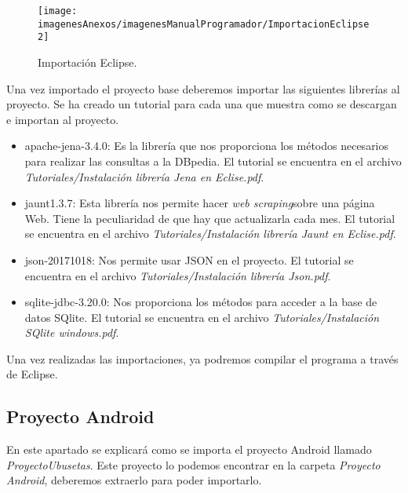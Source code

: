 \begin{figure}[h]
    \begin{center}%
        \begin{center}%
          \texttt{[image: imagenesAnexos/imagenesManualProgramador/ImportacionEclipse2]}%
          \caption{Importación Eclipse.}%
          \label{figImportacionEclipse2}%
        \end{center}%
  	\end{center}%
\end{figure}%

\clearpage
Una vez importado el proyecto base deberemos importar las siguientes librerías al proyecto. Se ha creado un tutorial para cada una que muestra como se descargan e importan al proyecto.

\begin{itemize}
	\item apache-jena-3.4.0: Es la librería que nos proporciona los métodos necesarios para realizar las consultas a la DBpedia. El tutorial se encuentra en el archivo \textit{Tutoriales/Instalación librería Jena en Eclise.pdf}.
	\item jaunt1.3.7: Esta librería nos permite hacer \textit{web scraping}sobre una página Web. Tiene la peculiaridad de que hay que actualizarla cada mes. El tutorial se encuentra en el archivo \textit{Tutoriales/Instalación librería Jaunt en Eclise.pdf}.
	\item json-20171018: Nos permite usar JSON en el proyecto. El tutorial se encuentra en el archivo \textit{Tutoriales/Instalación librería Json.pdf}.
	\item sqlite-jdbc-3.20.0: Nos proporciona los métodos para acceder a la base de datos SQlite. El tutorial se encuentra en el archivo \textit{Tutoriales/Instalación SQlite windows.pdf}.
\end{itemize}

Una vez realizadas las importaciones, ya podremos compilar el programa a través de Eclipse.

\clearpage

\subsection{Proyecto Android}

En este apartado se explicará como se importa el proyecto Android llamado \textit{ProyectoUbusetas}. Este proyecto lo podemos encontrar en la carpeta \textit{Proyecto Android}, deberemos extraerlo para poder importarlo.

